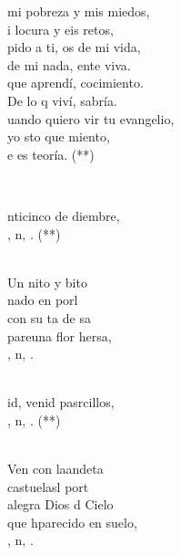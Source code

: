 \documentclass[12pt]{article}
\begin{document}
\begin{multicols*}{2}
\begin{cancion}
\begin{chorus}
	mi pobreza y  mis miedos, \\
	i locura y eis retos,\\
	pido a ti, os de mi vida, \\
	 de mi nada, ente viva.\\
\jump
	que aprendí, cocimiento. \\
	De lo q viví, sabría.\\
	uando quiero vir tu evangelio, \\
	yo sto que miento,\\
	e es teoría. (**)\\
	\end{chorus}%
	\jump\\
\end{cancion}%

\begin{cancion}%
	\begin{chorus}%
	nticinco de diembre,\\
	, n, . (**)\\
	\end{chorus}%
	\jump\\
	Un nito y bito \\
	 nado en  porl\\
	con su ta de sa\\
	pareuna flor hersa,\\
	, n, .\\\jump\\
	\begin{chorus}%
	id, venid pasrcillos,\\
	, n, . (**)\\
	\end{chorus}%
	\jump\\
	Ven con laandeta\\
	castuelasl port \\
	alegra Dios d Cielo\\
	que hparecido en  suelo,\\
	, n, .\\
\end{cancion}%


\end{multicols*}
\end{document}
